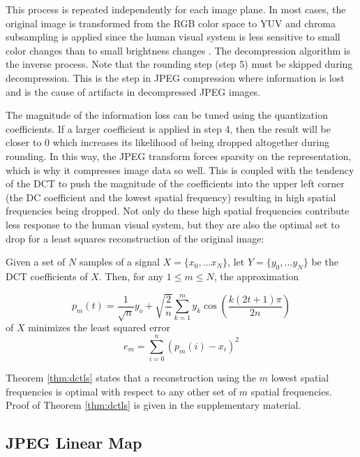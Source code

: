 \documentclass[10pt,twocolumn,letterpaper]{article}
\begin{document}
This process is repeated independently for each image plane. In most cases, the original image is transformed from the RGB color space to YUV and chroma subsampling is applied since the human visual system is less sensitive to small color changes than to small brightness changes \cite{winkler2001vision}. The decompression algorithm is the inverse process. Note that the rounding step (step 5) must be skipped during decompression. This is the step in JPEG compression where information is lost and is the cause of artifacts in decompressed JPEG images.

The magnitude of the information loss can be tuned using the quantization coefficients. If a larger coefficient is applied in step 4, then the result will be closer to 0 which increases its likelihood of being dropped altogether during rounding. In this way, the JPEG transform forces sparsity on the representation, which is why it compresses image data so well. This is coupled with the tendency of the DCT to push the magnitude of the coefficients into the upper left corner (the DC coefficient and the lowest spatial frequency) resulting in high spatial frequencies being dropped. Not only do these high spatial frequencies contribute less response to the human visual system, but they are also the optimal set to drop for a least squares reconstruction of the original image:

\begin{theorem}
    Given a set of $N$ samples of a signal $X = \{x_0, ... x_N\}$, let $Y = \{y_0, ... y_N\}$ be the DCT coefficients of $X$. Then, for any $1 \leq m \leq N$, the approximation
    
    \begin{equation}
    p_m(t) = \frac{1}{\sqrt{n}}y_o + \sqrt{\frac{2}{n}}\sum_{k=1}^{m} y_k\cos\left(\frac{k(2t + 1)\pi}{2n}\right)
    \end{equation}
    of $X$ minimizes the least squared error
    \begin{equation}
    e_m = \sum_{i=0}^{n} (p_m(i) - x_i)^2
    \end{equation}
    \label{thm:dctls}
\end{theorem}

Theorem \ref{thm:dctls} states that a reconstruction using the $m$ lowest spatial frequencies is optimal with respect to any other set of $m$ spatial frequencies. Proof of Theorem \ref{thm:dctls} is given in the supplementary material.

\subsection{JPEG Linear Map}\label{sec:backjlm}
\end{document}
